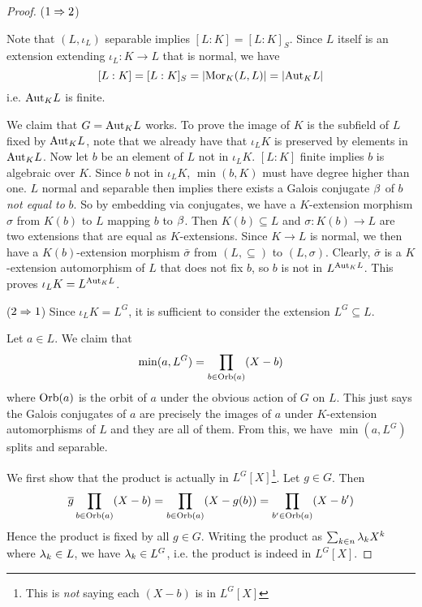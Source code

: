 \documentclass[../book.tex]{subfiles}
\begin{document}
\begin{proof}
    ($1\Rightarrow 2$)
        
        Note that $(L,\iota_L)$ separable implies $[L:K] = [L:K]_S$.
        Since $L$ itself is an extension extending $\iota_L : K \to L$ that is normal,
        we have \[
            [L : K] = [L : K]_S = |\mathrm{Mor}_{K}(L, L)| = |\mathrm{Aut}_{K}L|
        \]
        i.e. $\mathrm{Aut}_{K}L$ is finite. 
        
        We claim that $G = \mathrm{Aut}_{K}L$ works. 
        To prove the image of $K$ is the subfield of $L$ fixed by $\mathrm{Aut}_{K}L$,
        note that we already have that $\iota_L K$ is preserved by elements 
        in $\mathrm{Aut}_{K}L$.
        Now let $b$ be an element of $L$ not in $\iota_L K$. 
        $[L : K]$ finite implies $b$ is algebraic over $K$. 
        Since $b$ not in $\iota_L K$, $\min(b,K)$ must have degree higher than one. 
        $L$ normal and separable then implies 
        there exists a Galois conjugate $\beta$ of $b$ \emph{not equal to} $b$. 
        So by embedding via conjugates, 
        we have a $K$-extension morphism $\sigma$ 
        from $K(b)$ to $L$ mapping $b$ to $\beta$.
        Then $K(b) \subseteq L$ and $\sigma : K(b) \to L$ are two extensions
        that are equal as $K$-extensions.
        Since $K \to L$ is normal, 
        we then have a $K(b)$-extension morphism $\bar{\sigma}$
        from $(L,\subseteq)$ to $(L,\sigma)$. 
        Clearly, $\bar{\sigma}$ is a $K$-extension automorphism of $L$
        that does not fix $b$, 
        so $b$ is not in $L^{\mathrm{Aut}_{K}L}$.
        This proves $\iota_L K = L^{\mathrm{Aut}_{K}L}$. 
        
    ($2\Rightarrow 1$)
        Since $\iota_L K = L^G$, it is sufficient to consider the extension 
        $L^G \subseteq L$. 
        
        Let $a \in L$. We claim that \[
            \min(a,L^G) = \prod_{b \in \mathrm{Orb}(a)} (X - b)
        \]
        where $\mathrm{Orb}(a)$ is the orbit of $a$ under the obvious action of $G$ on $L$. 
        This just says the Galois conjugates of $a$ are precisely
        the images of $a$ under $K$-extension automorphisms of $L$
        and they are all of them.
        From this, we have $\min(a,L^G)$ splits and separable. 
    
        We first show that the product is actually in $L^G[X]$\footnote{
        This is \emph{not} saying each $(X - b)$ is in $L^G[X]$}. 
        Let $g \in G$. Then \[
            \overline{g} \prod_{b \in \mathrm{Orb}(a)} (X - b) 
            = \prod_{b \in \mathrm{Orb}(a)} (X - g(b)) = \prod_{b' \in \mathrm{Orb}(a)} (X - b')
        \]
        Hence the product is fixed by all $g \in G$. 
        Writing the product as $\sum_{k\in n} \lambda_k X^k$ where $\lambda_k \in L$,
        we have $\lambda_k \in L^G$, i.e. the product is indeed in $L^G[X]$. 
        

\end{proof}
\end{document}
